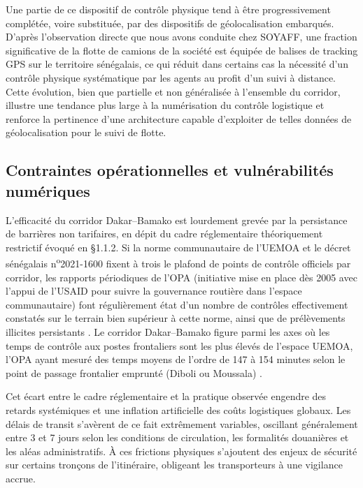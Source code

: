 Une partie de ce dispositif de contrôle physique tend à être progressivement complétée, voire substituée, par des dispositifs de géolocalisation embarqués. D'après l'observation directe que nous avons conduite chez SOYAFF, une fraction significative de la flotte de camions de la société est équipée de balises de tracking GPS sur le territoire sénégalais, ce qui réduit dans certains cas la nécessité d'un contrôle physique systématique par les agents au profit d'un suivi à distance. Cette évolution, bien que partielle et non généralisée à l'ensemble du corridor, illustre une tendance plus large à la numérisation du contrôle logistique et renforce la pertinence d'une architecture capable d'exploiter de telles données de géolocalisation pour le suivi de flotte.

\subsection{Contraintes opérationnelles et vulnérabilités numériques}
L'efficacité du corridor Dakar--Bamako est lourdement grevée par la persistance de barrières non tarifaires, en dépit du cadre réglementaire théoriquement restrictif évoqué en §1.1.2. Si la norme communautaire de l'UEMOA et le décret sénégalais n\textsuperscript{o}2021-1600 fixent à trois le plafond de points de contrôle officiels par corridor, les rapports périodiques de l'OPA (initiative mise en place dès 2005 avec l'appui de l'USAID pour suivre la gouvernance routière dans l'espace communautaire) font régulièrement état d'un nombre de contrôles effectivement constatés sur le terrain bien supérieur à cette norme, ainsi que de prélèvements illicites persistants \cite{uemoaOPA2017}. Le corridor Dakar--Bamako figure parmi les axes où les temps de contrôle aux postes frontaliers sont les plus élevés de l'espace UEMOA, l'OPA ayant mesuré des temps moyens de l'ordre de 147 à 154 minutes selon le point de passage frontalier emprunté (Diboli ou Moussala) \cite{uemoaOPA2017}.

Cet écart entre le cadre réglementaire et la pratique observée engendre des retards systémiques et une inflation artificielle des coûts logistiques globaux. Les délais de transit s'avèrent de ce fait extrêmement variables, oscillant généralement entre 3 et 7 jours selon les conditions de circulation, les formalités douanières et les aléas administratifs. À ces frictions physiques s'ajoutent des enjeux de sécurité sur certains tronçons de l'itinéraire, obligeant les transporteurs à une vigilance accrue. 

